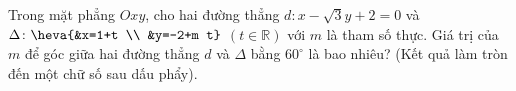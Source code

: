 \begin{bt}%
	Trong mặt phẳng $Oxy$, cho hai đường thẳng $d\colon x-\sqrt{3} y+2=0$ và $\Delta\colon \heva{&x=1+t \\ &y=-2+m t}$ $(t \in \mathbb{R})$ với $m$ là tham số thực. Giá trị của  $m$ để góc giữa hai đường thẳng $d$ và $\Delta$ bằng $60^{\circ}$ là bao nhiêu? (Kết quả làm tròn đến một chữ số sau dấu phẩy).
\end{bt}

